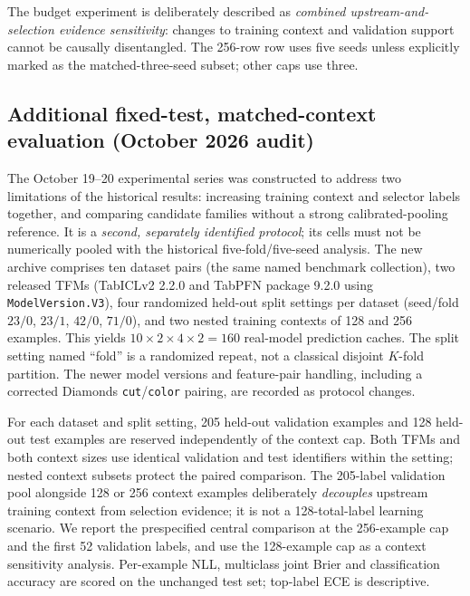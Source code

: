 \documentclass[a4paper,fleqn]{cas-sc}
\begin{document}
The budget experiment is deliberately described as \emph{combined upstream-and-selection evidence sensitivity}: changes to training context and validation support cannot be causally disentangled. The 256-row row uses five seeds unless explicitly marked as the matched-three-seed subset; other caps use three.


\subsection{Additional fixed-test, matched-context evaluation (October 2026 audit)}
\label{sec:fixedtest}
The October 19--20 experimental series was constructed to address two limitations of the historical results: increasing training context and selector labels together, and comparing candidate families without a strong calibrated-pooling reference. It is a \emph{second, separately identified protocol}; its cells must not be numerically pooled with the historical five-fold/five-seed analysis. The new archive comprises ten dataset pairs (the same named benchmark collection), two released TFMs (TabICLv2 2.2.0 and TabPFN package 9.2.0 using \texttt{ModelVersion.V3}), four randomized held-out split settings per dataset (seed/fold $23/0$, $23/1$, $42/0$, $71/0$), and two nested training contexts of 128 and 256 examples. This yields $10\times2\times4\times2=160$ real-model prediction caches. The split setting named ``fold'' is a randomized repeat, not a classical disjoint $K$-fold partition. The newer model versions and feature-pair handling, including a corrected Diamonds \texttt{cut}/\texttt{color} pairing, are recorded as protocol changes.

For each dataset and split setting, 205 held-out validation examples and 128 held-out test examples are reserved independently of the context cap. Both TFMs and both context sizes use identical validation and test identifiers within the setting; nested context subsets protect the paired comparison. The 205-label validation pool alongside 128 or 256 context examples deliberately \emph{decouples} upstream training context from selection evidence; it is not a 128-total-label learning scenario. We report the prespecified central comparison at the 256-example cap and the first 52 validation labels, and use the 128-example cap as a context sensitivity analysis. Per-example NLL, multiclass joint Brier and classification accuracy are scored on the unchanged test set; top-label ECE is descriptive.
\end{document}
